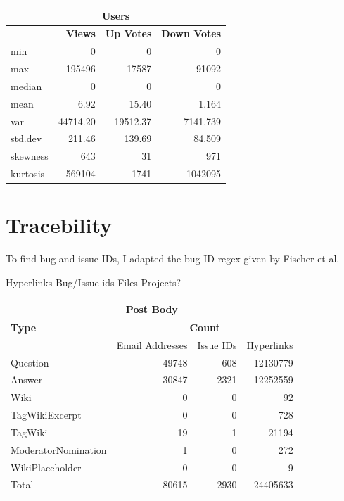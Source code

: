\documentclass{article}
\begin{document}
\begin{tabular}[t]{| l | r |r|r|} \hline
\multicolumn{4}{|c|}{Users} \\ \hline
& \bf{Views} & \bf{Up Votes} & \bf{Down Votes} \\ \hline 
min      &          0  &      0 &      0  \\ \hline 
max      &     195496  &  17587 &  91092  \\ \hline 
median       &      0 &      0  &    0  \\ \hline  
mean         &      6.92   &    15.40 &      1.164  \\ \hline 
var       &     44714.20  &  19512.37  &  7141.739  \\ \hline 
std.dev     &     211.46  &    139.69 &     84.509  \\ \hline 
skewness & 643   &      31   &     971  \\ \hline 
kurtosis & 569104   &    1741 &   1042095  \\ \hline 
\end{tabular}

\section{Tracebility}

To find bug and issue IDs, I adapted the bug ID regex given by Fischer et al. \cite{fischer}

Hyperlinks
Bug/Issue ids
Files
Projects?

\begin{tabular}[t]{| l | r | r | r |}
\hline
\multicolumn{4}{|c|}{Post Body} \\ \hline
\bf{Type} & \multicolumn{3}{|c|}{\bf{Count}} \\ \hline
 & Email Addresses & Issue IDs & Hyperlinks \\ \hline
Question & 49748 & 608 & 12130779 \\ \hline
Answer & 30847 & 2321 & 12252559 \\ \hline
Wiki &  0 & 0 & 92\\ \hline
TagWikiExcerpt & 0 & 0 & 728\\ \hline
TagWiki & 19 & 1 & 21194\\ \hline
ModeratorNomination & 1 & 0 & 272 \\ \hline
WikiPlaceholder & 0 & 0 & 9\\ \hline
Total& 80615 & 2930 & 24405633 \\ \hline      
\end{tabular}
\end{document}
